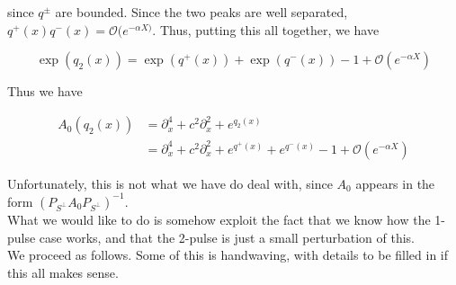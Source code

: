 \documentclass[12pt]{article}
\begin{document}
since $q^\pm$ are bounded. Since the two peaks are well separated, $q^+(x)q^-(x) = \mathcal{O}(e^{-\alpha X)}$. Thus, putting this all together, we have

\begin{equation}
\exp(q_2(x)) = \exp( q^+(x)) + \exp(q^-(x)) - 1 + \mathcal{O}(e^{-\alpha X}) 
\end{equation}

Thus we have

\begin{align*}
A_0(q_2(x)) &= \partial_x^4 + c^2 \partial_x^2 + e^{q_2(x)} \\
&= \partial_x^4 + c^2 \partial_x^2 + e^{q^+(x)} + e^{q^-(x)} - 1 + \mathcal{O}(e^{-\alpha X})
\end{align*}

Unfortunately, this is not what we have do deal with, since $A_0$ appears in the form $(P_{S^\perp}A_0 P_{S^\perp})^{-1}$.\\

What we would like to do is somehow exploit the fact that we know how the 1-pulse case works, and that the 2-pulse is just a small perturbation of this.\\

We proceed as follows. Some of this is handwaving, with details to be filled in if this all makes sense.
\end{document}
